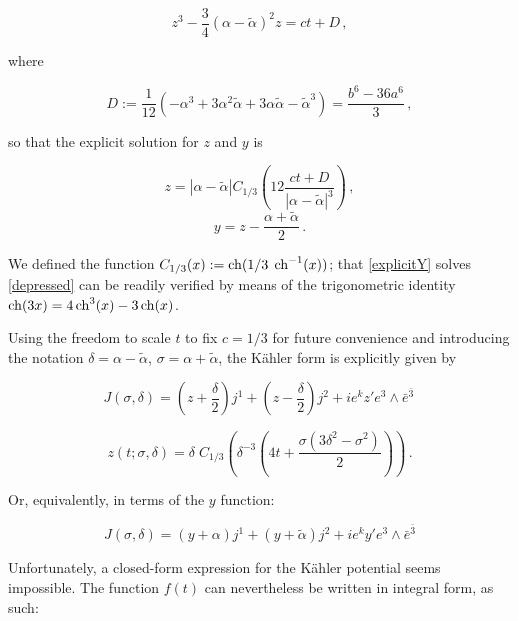 \begin{equation}
	z^3 - \frac{3}4 (\alpha - \tilde\alpha)^2 z = ct + D\,,
	\label{depressed}
\end{equation}

where

\begin{equation}
	D := \frac{1}{12}(-\alpha^3 + 3 \alpha^2 \tilde\alpha + 3 \alpha\tilde{\alpha} - \tilde{\alpha}^3) = \frac{b^6-36a^6}{3}\,,
	\label{dprime}
\end{equation}

so that the explicit solution for $z$ and $y$ is

\begin{equation}
	z = |\alpha - \tilde \alpha| C_{1/3} \left( 12 \frac{ct + D}{|\alpha-\tilde\alpha|^3} \right) \,,
	\label{explicitz}
\end{equation}
\begin{equation}
	y = z - \frac{\alpha + \tilde{\alpha}}2 \,.
	\label{explicitY}
\end{equation}

We defined the function $C_{1/3}(x) := \operatorname{ch}(1/3 \; \operatorname{ch}^{-1}(x))$; that \eqref{explicitY} solves \eqref{depressed} can be readily verified by means of the trigonometric identity $\operatorname{ch}(3x) = 4 \operatorname{ch}^3(x) - 3 \operatorname{ch}(x)$.

Using the freedom to scale $t$ to fix $c=1/3$ for future convenience and introducing the notation $\delta = \alpha - \tilde{\alpha}$, $\sigma = \alpha + \tilde{\alpha}$, the K\"ahler form is explicitly given by

\begin{equation}
	J(\sigma,\delta) = \left(  z + \frac{\delta}{2}\right) j^1 + \left(z-\frac{\delta}{2}\right) j^2 + ie^k z' e^3 \wedge \bar e^{\bar 3}\,
	\label{}
\end{equation}

\begin{equation}
	z(t;\sigma,\delta) = \delta \;C_{1/3} \left( \delta^{-3} \left( 4t + \frac{\sigma(3\delta^2 - \sigma^2)}{2} \right) \right)\,.
	\label{}
\end{equation}

Or, equivalently, in terms of the $y$ function:

\begin{equation}
	J(\sigma,\delta) = (y+\alpha) j^1 + (y+\tilde{\alpha})j^2 + ie^k y' e^3 \wedge \bar e^{\bar 3}
	\label{}
\end{equation}

Unfortunately, a closed-form expression for the K\"ahler potential seems impossible. The function $f(t)$ can nevertheless be written in integral form, as such:

